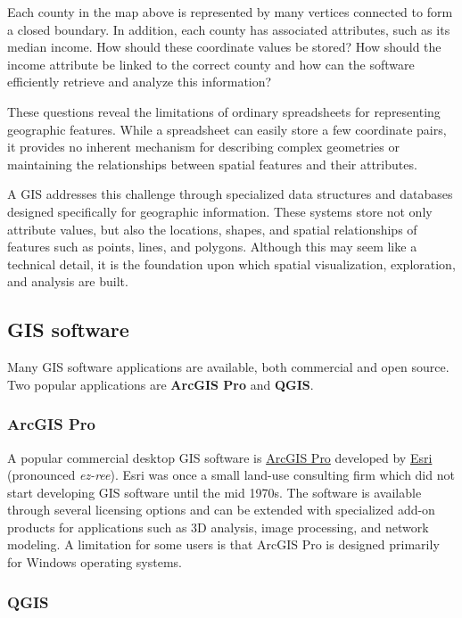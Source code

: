 \documentclass[
  letterpaper,
]{book}
\begin{document}
Each county in the map above is represented by many vertices connected
to form a closed boundary. In addition, each county has associated
attributes, such as its median income. How should these coordinate
values be stored? How should the income attribute be linked to the
correct county and how can the software efficiently retrieve and analyze
this information?

These questions reveal the limitations of ordinary spreadsheets for
representing geographic features. While a spreadsheet can easily store a
few coordinate pairs, it provides no inherent mechanism for describing
complex geometries or maintaining the relationships between spatial
features and their attributes.

A GIS addresses this challenge through specialized data structures and
databases designed specifically for geographic information. These
systems store not only attribute values, but also the locations, shapes,
and spatial relationships of features such as points, lines, and
polygons. Although this may seem like a technical detail, it is the
foundation upon which spatial visualization, exploration, and analysis
are built.

\subsection{GIS software}\label{gis-software}

Many GIS software applications are available, both commercial and open
source. Two popular applications are \textbf{ArcGIS Pro} and
\textbf{QGIS}.

\subsubsection{ArcGIS Pro}\label{arcgis-pro}

A popular commercial desktop GIS software is
\href{https://www.esri.com/en-us/arcgis/products/arcgis-pro/overview}{ArcGIS
Pro} developed by \href{https://en.wikipedia.org/wiki/Esri}{Esri}
(pronounced \emph{ez-ree}). Esri was once a small land-use consulting
firm which did not start developing GIS software until the mid 1970s.
The software is available through several licensing options and can be
extended with specialized add-on products for applications such as 3D
analysis, image processing, and network modeling. A limitation for some
users is that ArcGIS Pro is designed primarily for Windows operating
systems.

\subsubsection{QGIS}\label{qgis}
\end{document}
